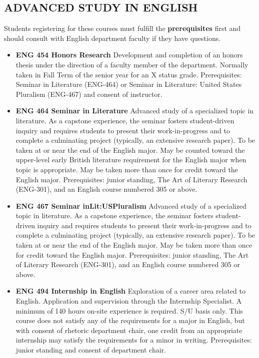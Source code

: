 \documentclass[
  letterpaper,
]{scrbook}
\providecommand{\tightlist}{%
  \setlength{\itemsep}{0pt}\setlength{\parskip}{0pt}}
\begin{document}
\hypertarget{advanced-study-in-english}{%
\subsection{ADVANCED STUDY IN ENGLISH}\label{advanced-study-in-english}}

Students registering for these courses must fulfill the
\textbf{prerequisites} first and should consult with English department
faculty if they have questions.

\begin{itemize}
\tightlist
\item
  \textbf{ENG 454 Honors Research} Development and completion of an
  honors thesis under the direction of a faculty member of the
  department. Normally taken in Fall Term of the senior year for an X
  status grade. Prerequisites: Seminar in Literature (ENG-464) or
  Seminar in Literature: United States Pluralism (ENG-467) and consent
  of instructor.\\
\item
  \textbf{ENG 464 Seminar in Literature} Advanced study of a specialized
  topic in literature. As a capstone experience, the seminar fosters
  student-driven inquiry and requires students to present their
  work-in-progress and to complete a culminating project (typically, an
  extensive research paper). To be taken at or near the end of the
  English major. May be counted toward the upper-level early British
  literature requirement for the English major when topic is
  appropriate. May be taken more than once for credit toward the English
  major. Prerequisites: junior standing, The Art of Literary Research
  (ENG-301), and an English course numbered 305 or above.
\item
  \textbf{ENG 467 Seminar inLit:USPluralism} Advanced study of a
  specialized topic in literature. As a capstone experience, the seminar
  fosters student-driven inquiry and requires students to present their
  work-in-progress and to complete a culminating project (typically, an
  extensive research paper). To be taken at or near the end of the
  English major. May be taken more than once for credit toward the
  English major. Prerequisites: junior standing, The Art of Literary
  Research (ENG-301), and an English course numbered 305 or above.
\item
  \textbf{ENG 494 Internship in English} Exploration of a career area
  related to English. Application and supervision through the Internship
  Specialist. A minimum of 140 hours on-site experience is required. S/U
  basis only. This course does not satisfy any of the requirements for a
  major in English, but with consent of rhetoric department chair, one
  credit from an appropriate internship may satisfy the requirements for
  a minor in writing. Prerequisites: junior standing and consent of
  department chair.
\end{itemize}
\end{document}
